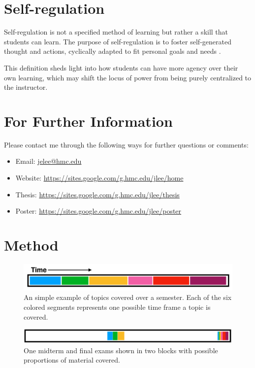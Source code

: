 \documentclass[thesis]{hmcposter}
\begin{document}
\begin{poster}
\section{Self-regulation}

Self-regulation is not a specified method of learning but rather a skill that students can learn. The purpose of self-regulation is to foster self-generated thought and actions, cyclically adapted to fit personal goals and needs \citep{boekaerts}.

This definition sheds light into how students can have more agency over their own learning, which may shift the locus of power from being purely centralized to the instructor.

\section{For Further Information}
Please contact me through the following ways for further questions or comments:
\begin{itemize}
\item Email: \url{jelee@hmc.edu}
\item Website: \url{https://sites.google.com/g.hmc.edu/jlee/home}
\item Thesis: \url{https://sites.google.com/g.hmc.edu/jlee/thesis}
\item Poster: \url{https://sites.google.com/g.hmc.edu/jlee/poster}
\end{itemize}


\vfill
\columnbreak

\section{Method}%

\begin{figure}
\begin{center}
\includegraphics[width=12in]{units}
\caption{An simple example of topics covered over a semester. Each of the six colored segments represents one possible time frame a topic is covered.}%
\end{center}
\end{figure}

\begin{figure}
\begin{center}
\includegraphics[width=12in]{trad}
\caption{One midterm and final exams shown in two blocks with possible proportions of material covered.}%
\end{center}
\end{figure}


\end{poster}
\end{document}
